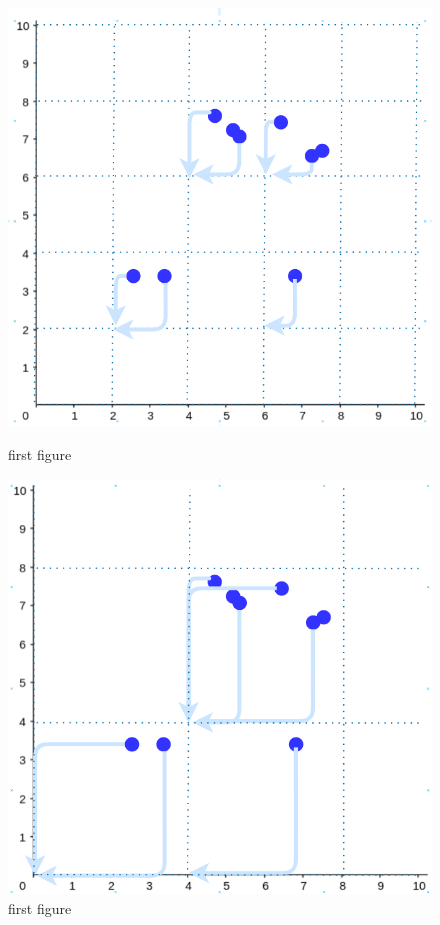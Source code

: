 \begin{figure}
  \centering
  \begin{minipage}{0.45\linewidth}
      \centering
      \includegraphics[width=\textwidth]{images/binning-1dev.png}
      \caption{first figure}
      \label{fig:binning-1}
  \end{minipage}\hfill
  \begin{minipage}{0.45\linewidth}
      \centering
      \includegraphics[width=\textwidth]{images/binning-2dev.png}
      \caption{first figure}
      \label{fig:binning-2}
  \end{minipage}
\end{figure}

